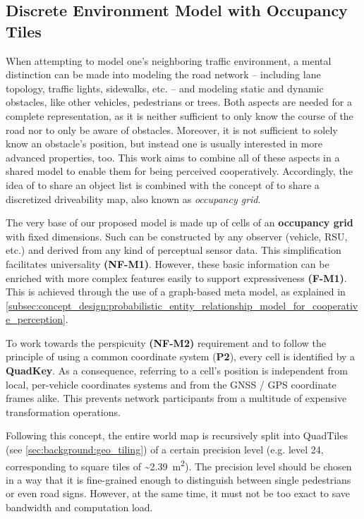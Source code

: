 \subsection{Discrete Environment Model with Occupancy Tiles}
\label{subsec:concept_design:discrete_environment_model_with_occupancy_tiles}

When attempting to model one's neighboring traffic environment, a mental distinction can be made into modeling the road network – including lane topology, traffic lights, sidewalks, etc. – and modeling static and dynamic obstacles, like other vehicles, pedestrians or trees. Both aspects are needed for a complete representation, as it is neither sufficient to only know the course of the road nor to only be aware of obstacles. Moreover, it is not sufficient to solely know an obstacle's position, but instead one is usually interested in more advanced properties, too. This work aims to combine all of these aspects in a shared model to enable them for being perceived cooperatively. Accordingly, the idea of \cite{Rauch2011} to share an object list is combined with the concept of \cite{liu2013motion} to share a discretized driveability map, also known as \textit{occupancy grid}. 
\par
\bigskip

The very base of our proposed model is made up of cells of an \textbf{occupancy grid} with fixed dimensions. Such can be constructed by any observer (vehicle, RSU, etc.) and derived from any kind of perceptual sensor data. This simplification facilitates universality \textbf{(NF-M1)}. However, these basic information can be enriched with more complex features easily to support expressiveness \textbf{(F-M1)}. This is achieved through the use of a graph-based meta model, as explained in \cref{subsec:concept_design:probabilistic_entity_relationship_model_for_cooperative_perception}.

To work towards the perspicuity \textbf{(NF-M2)} requirement and to follow the principle of using a common coordinate system (\textbf{P2}), every cell is identified by a \textbf{QuadKey}. As a consequence, referring to a cell's position is independent from local, per-vehicle coordinates systems and from the GNSS / GPS coordinate frames alike. This prevents network participants from a multitude of expensive transformation operations.

Following this concept, the entire world map is recursively split into QuadTiles (see \cref{sec:background:geo_tiling}) of a certain precision level (e.g. level 24, corresponding to square tiles of \textasciitilde\SI{2.39}{\square\meter}). The precision level should be chosen in a way that it is fine-grained enough to distinguish between single pedestrians or even road signs. However, at the same time, it must not be too exact to save bandwidth and computation load.

